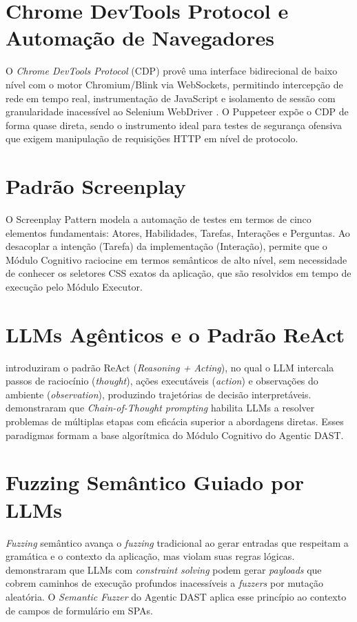 \documentclass[
    12pt,
    openany,
    oneside,
    a4paper,
    brazil
]{abntex2}
\begin{document}
\section{Chrome DevTools Protocol e Automação de Navegadores}

O \textit{Chrome DevTools Protocol} (CDP) provê uma interface
bidirecional de baixo nível com o motor Chromium/Blink via WebSockets,
permitindo intercepção de rede em tempo real, instrumentação de
JavaScript e isolamento de sessão com granularidade inacessível ao
Selenium WebDriver \cite{lightpanda2024}. O Puppeteer expõe o CDP de
forma quase direta, sendo o instrumento ideal para testes de segurança
ofensiva que exigem manipulação de requisições HTTP em nível de
protocolo.

\section{Padrão Screenplay}

O Screenplay Pattern \cite{serenityscreenplay} modela a automação de
testes em termos de cinco elementos fundamentais: Atores, Habilidades,
Tarefas, Interações e Perguntas. Ao desacoplar a intenção (Tarefa) da
implementação (Interação), permite que o Módulo Cognitivo raciocine em
termos semânticos de alto nível, sem necessidade de conhecer os
seletores CSS exatos da aplicação, que são resolvidos em tempo de
execução pelo Módulo Executor.

\section{LLMs Agênticos e o Padrão ReAct}

 introduziram o padrão ReAct
(\textit{Reasoning + Acting}), no qual o LLM intercala passos de
raciocínio (\textit{thought}), ações executáveis (\textit{action}) e
observações do ambiente (\textit{observation}), produzindo trajetórias
de decisão interpretáveis.  demonstraram que
\textit{Chain-of-Thought prompting} habilita LLMs a resolver problemas
de múltiplas etapas com eficácia superior a abordagens diretas. Esses
paradigmas formam a base algorítmica do Módulo Cognitivo do Agentic
DAST.

\section{Fuzzing Semântico Guiado por LLMs}

\textit{Fuzzing} semântico avança o \textit{fuzzing} tradicional ao
gerar entradas que respeitam a gramática e o contexto da aplicação, mas
violam suas regras lógicas.  demonstraram
que LLMs com \textit{constraint solving} podem gerar \textit{payloads}
que cobrem caminhos de execução profundos inacessíveis a
\textit{fuzzers} por mutação aleatória. O \textit{Semantic Fuzzer} do
Agentic DAST aplica esse princípio ao contexto de campos de formulário
em SPAs.
\end{document}

